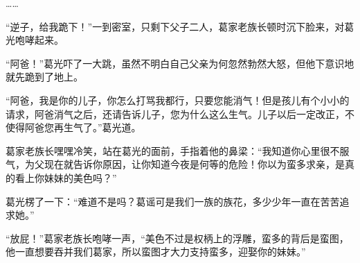 \begin{this_body}
……

“逆子，给我跪下！”一到密室，只剩下父子二人，葛家老族长顿时沉下脸来，对葛光咆哮起来。

“阿爸！”葛光吓了一大跳，虽然不明白自己父亲为何忽然勃然大怒，但他下意识地就先跪到了地上。

“阿爸，我是你的儿子，你怎么打骂我都行，只要您能消气！但是孩儿有个小小的请求，阿爸消气之后，还请告诉儿子，您为什么这么生气。儿子以后一定改正，不使得阿爸您再生气了。”葛光道。

葛家老族长嘿嘿冷笑，站在葛光的面前，手指着他的鼻梁：“我知道你心里很不服气，为父现在就告诉你原因，让你知道今夜是何等的危险！你以为蛮多求亲，是真的看上你妹妹的美色吗？”

葛光楞了一下：“难道不是吗？葛谣可是我们一族的族花，多少少年一直在苦苦追求她。”

“放屁！”葛家老族长咆哮一声，“美色不过是权柄上的浮雕，蛮多的背后是蛮图，他一直想要吞并我们葛家，所以蛮图才大力支持蛮多，迎娶你的妹妹。”

\end{this_body}

